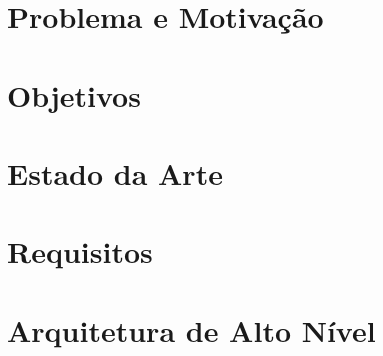 \documentclass[
    12pt,
    a4paper
]{article}
\begin{document}
\section{Problema e Motivação}


\section{Objetivos}


\section{Estado da Arte}


\section{Requisitos}


\section{Arquitetura de Alto Nível}



\newpage

\printbibliography
\end{document}

